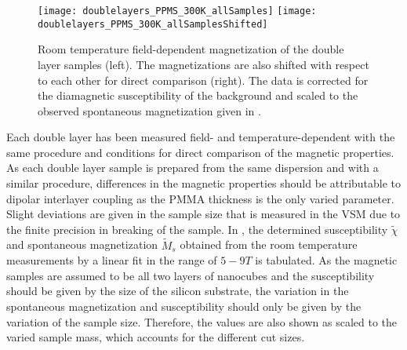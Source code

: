 \documentclass[\main/dresen_thesis.tex]{subfiles}
\begin{document}
  \label{sec:doubleLayers:vsm}

  \begin{figure}[tb]
    \centering
    \texttt{[image: doublelayers\_PPMS\_300K\_allSamples]}
    \texttt{[image: doublelayers\_PPMS\_300K\_allSamplesShifted]}
    \caption{\label{fig:doubleLayers:RTVSM}Room temperature field-dependent magnetization of the double layer samples (left). The magnetizations are also shifted with respect to each other for direct comparison (right). The data is corrected for the diamagnetic susceptibility of the background and scaled to the observed spontaneous magnetization given in .}
  \end{figure}

    Each double layer has been measured field- and temperature-dependent with the same procedure and conditions for direct comparison of the magnetic properties.
    As each double layer sample is prepared from the same dispersion and with a similar procedure, differences in the magnetic properties should be attributable to dipolar interlayer coupling as the PMMA thickness is the only varied parameter.
    Slight deviations are given in the sample size that is measured in the VSM due to the finite precision in breaking of the sample.
    In , the determined susceptibility $\tilde{\chi}$ and spontaneous magnetization $\tilde{M}_s$ obtained from the room temperature measurements by a linear fit in the range of $5 - 9 \unit{T}$ is tabulated.
    As the magnetic samples are assumed to be all two layers of nanocubes and the susceptibility should be given by the size of the silicon substrate, the variation in the spontaneous magnetization and susceptibility should only be given by the variation of the sample size.
    Therefore, the values are also shown as scaled to the varied sample mass, which accounts for the different cut sizes.
\end{document}
